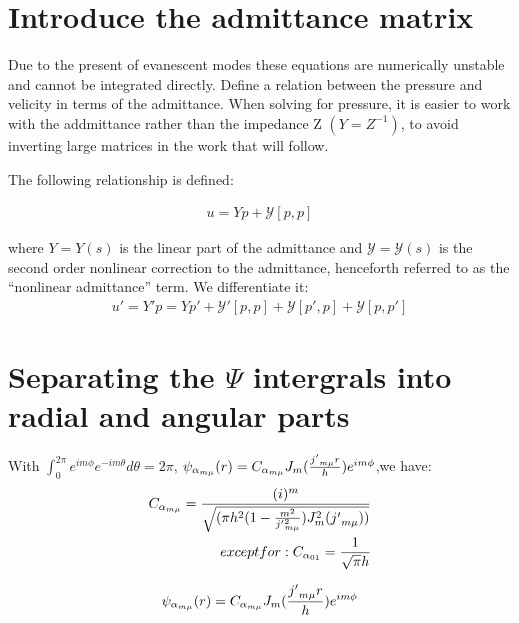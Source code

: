 \documentclass{Note}
\begin{document}
\section{Introduce the admittance matrix}

Due to the present of evanescent modes these equations are numerically unstable and cannot be integrated directly. Define a relation between the pressure and velicity in terms of the admittance. When solving for pressure, it is easier to work with the addmittance rather than the impedance Z $(Y=Z^{-1})$, to avoid inverting large matrices in the work that will follow.

The following relationship is defined:

\begin{equation}
\begin{aligned}
u=Yp+\mathcal{Y}[p,p]
\end{aligned}
\end{equation}

where $Y=Y(s)$ is the linear part of the admittance and $\mathcal{Y}=\mathcal{Y}(s)$ is the second order nonlinear correction to the admittance, henceforth referred to as the “nonlinear admittance” term. We differentiate it:
\begin{equation}
\begin{aligned}
u'=Y'p=Yp'+\mathcal{Y}'[p,p]+\mathcal{Y}[p',p]+\mathcal{Y}[p,p']
\end{aligned}
\end{equation}




\section{Separating the $\Psi$ intergrals into radial and angular parts}

With $\int_0^{2\pi} e^{im\phi}e^{-im\theta}  d\theta=2\pi$,
$\psi_{\alpha_{m\mu}}(r)=C_{\alpha_{m\mu}}J_m({{j'}_{m\mu} r\over h})e^{im\phi}$,we have:
\begin{equation}
\begin{aligned}
C_{\alpha_{m\mu}}={(i)^m \over \sqrt{({{\pi h^2}(1-{m^2\over {j'}_{m\mu}^2} )}J^2_m({j'}_{m\mu}))}}\\
except for:
C_{\alpha_{01}}={1 \over \sqrt{\pi}h}
\end{aligned}
\end{equation}

\begin{equation}
\begin{aligned}
\psi_{\alpha_{m\mu}}(r)=C_{\alpha_{m\mu}}J_m({{j'}_{m\mu} r\over h})e^{im\phi}
\end{aligned}
\end{equation}
\end{document}
